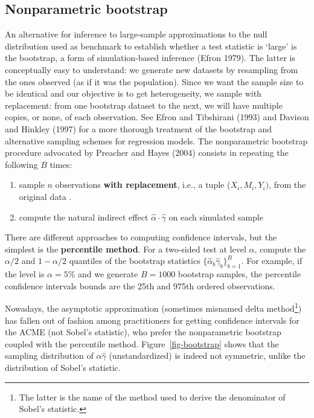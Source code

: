 \documentclass[
  11pt,
  letterpaper,
]{scrbook}
\providecommand{\tightlist}{%
  \setlength{\itemsep}{0pt}\setlength{\parskip}{0pt}}\usepackage{longtable,booktabs,array}
\theoremstyle{definition}
\theoremstyle{definition}
\theoremstyle{remark}
\begin{document}
\subsection{Nonparametric bootstrap}\label{nonparametric-bootstrap}

An alternative for inference to large-sample approximations to the null
distribution used as benchmark to establish whether a test statistic is
`large' is the bootstrap, a form of simulation-based inference (Efron
1979). The latter is conceptually easy to understand: we generate new
datasets by resampling from the ones observed (as if it was the
population). Since we want the sample size to be identical and our
objective is to get heterogeneity, we sample with replacement: from one
bootstrap dataset to the next, we will have multiple copies, or none, of
each observation. See Efron and Tibshirani (1993) and Davison and
Hinkley (1997) for a more thorough treatment of the bootstrap and
alternative sampling schemes for regression models. The nonparametric
bootstrap procedure advocated by Preacher and Hayes (2004) consists in
repeating the following \(B\) times:

\begin{enumerate}
\def\labelenumi{\arabic{enumi})}
\tightlist
\item
  sample \(n\) observations \textbf{with replacement}, i.e., a tuple
  (\(X_i, M_i, Y_i)\), from the original data .
\item
  compute the natural indirect effect
  \(\widehat{\alpha}\cdot\widehat{\gamma}\) on each simulated sample
\end{enumerate}

There are different approaches to computing confidence intervals, but
the simplest is the \textbf{percentile method}. For a two-sided test at
level \(\alpha\), compute the \(\alpha/2\) and \(1-\alpha/2\) quantiles
of the bootstrap statistics
\(\{\widehat{\alpha}_b\widehat{\gamma}_b\}_{b=1}^B\). For example, if
the level is \(\alpha=5\)\% and we generate \(B=1000\) bootstrap
samples, the percentile confidence intervals bounds are the 25th and
975th ordered observations.

Nowadays, the asymptotic approximation (sometimes misnamed delta
method\footnote{The latter is the name of the method used to derive the
  denominator of Sobel's statistic.}) has fallen out of fashion among
practitioners for getting confidence intervals for the ACME (not Sobel's
statistic), who prefer the nonparametric bootstrap coupled with the
percentile method. Figure~\ref{fig-bootstrap} shows that the sampling
distribution of \(\widehat{\alpha}\widehat{\gamma}\) (unstandardized) is
indeed not symmetric, unlike the distribution of Sobel's statistic.
\end{document}
